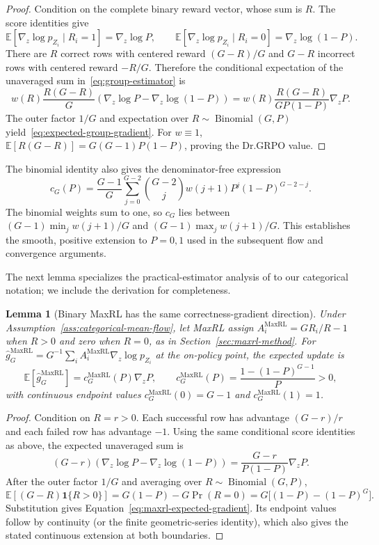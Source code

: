 \documentclass{article}
\newcommand{\1}{\mathbf 1}
\newcommand{\E}{\mathbb E}
\newtheorem{lemma}{Lemma}[section]
\theoremstyle{remark}
\theoremstyle{definition}
\theoremstyle{plain}
\begin{document}
\begin{proof}
Condition on the complete binary reward vector, whose sum is $R$. The score
identities give
\[
  \E[\nabla_z\log p_{Z_i}\mid R_i=1]=\nabla_z\log P,
  \qquad
  \E[\nabla_z\log p_{Z_i}\mid R_i=0]
  =\nabla_z\log(1-P).
\]
There are $R$ correct rows with centered reward $(G-R)/G$ and $G-R$
incorrect rows with centered reward $-R/G$. Therefore the conditional
expectation of the unaveraged sum in~\eqref{eq:group-estimator} is
\[
  w(R)\frac{R(G-R)}{G}
  \left(\nabla_z\log P-\nabla_z\log(1-P)\right)
  =w(R)\frac{R(G-R)}{GP(1-P)}\nabla_zP.
\]
The outer factor $1/G$ and expectation over
$R\sim\operatorname{Binomial}(G,P)$ yield~\eqref{eq:expected-group-gradient}.
For $w\equiv1$,
$\E[R(G-R)]=G(G-1)P(1-P)$, proving the Dr.GRPO value.
\end{proof}

The binomial identity also gives the denominator-free expression
\[
 c_G(P)=\frac{G-1}{G}\sum_{j=0}^{G-2}\binom{G-2}{j}
 w(j+1)P^j(1-P)^{G-2-j}.
\]
The binomial weights sum to one, so $c_G$ lies between
$(G-1)\min_j w(j+1)/G$ and $(G-1)\max_j w(j+1)/G$.
This establishes the smooth, positive extension to $P=0,1$ used in the
subsequent flow and convergence arguments.

The next lemma specializes the practical-estimator analysis of
\citet[Section~4.3 and App.~D, Theorem~5]{tajwar2026maxrl}
to our categorical notation; we include the derivation for completeness.

\begin{lemma}[Binary MaxRL has the same correctness-gradient direction]
\label{lem:maxrl-mean}
Under Assumption~\ref{ass:categorical-mean-flow}, let MaxRL assign
$A_i^{\mathrm{MaxRL}}=GR_i/R-1$ when $R>0$ and zero when $R=0$, as in
Section~\ref{sec:maxrl-method}. For
$\widehat g_G^{\mathrm{MaxRL}}=G^{-1}\sum_i
 A_i^{\mathrm{MaxRL}}\nabla_z\log p_{Z_i}$ at the on-policy point, the
expected update is
\begin{equation}
  \E[\widehat g_G^{\mathrm{MaxRL}}]
  =c_G^{\mathrm{MaxRL}}(P)\nabla_zP,
  \qquad
  c_G^{\mathrm{MaxRL}}(P)
  =\frac{1-(1-P)^{G-1}}{P}>0,
  \label{eq:maxrl-expected-gradient}
\end{equation}
with continuous endpoint values
$c_G^{\mathrm{MaxRL}}(0)=G-1$ and
$c_G^{\mathrm{MaxRL}}(1)=1$.
\end{lemma}

\begin{proof}
Condition on $R=r>0$. Each successful row has advantage $(G-r)/r$ and each
failed row has advantage $-1$. Using the same conditional score identities as
above, the expected unaveraged sum is
\[
  (G-r)\!\left(\nabla_z\log P-\nabla_z\log(1-P)\right)
  =\frac{G-r}{P(1-P)}\nabla_zP.
\]
After the outer factor $1/G$ and averaging over
$R\sim\operatorname{Binomial}(G,P)$,
\[
 \E[(G-R)\1\{R>0\}]
 =G(1-P)-G\Pr(R=0)
 =G\big[(1-P)-(1-P)^G\big].
\]
Substitution gives Equation~\eqref{eq:maxrl-expected-gradient}. Its endpoint
values follow by continuity (or the finite geometric-series identity), which
also gives the stated continuous extension at both boundaries.
\end{proof}
\end{document}
